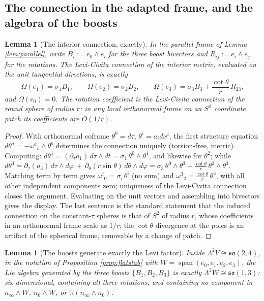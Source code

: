 \documentclass[11pt]{article}
\newtheorem{lemma}[theorem]{Lemma}
\theoremstyle{definition}
\newcommand{\R}{\mathbb{R}}
\newcommand{\nO}{n_0}
\newcommand{\nInf}{n_\infty}
\begin{document}
\subsection{The connection in the adapted frame, and the algebra of the boosts}\label{subsec:connframe}

\begin{lemma}[The interior connection, exactly]\label{lem:conn}
In the parallel frame of Lemma \ref{lem:parallel}, write $B_i := e_0 \wedge e_i$ for the three boost bivectors and $R_{ij} := e_i \wedge e_j$ for the rotations. The Levi-Civita connection of the interior metric, evaluated on the unit tangential directions, is exactly
\[
\Omega(e_1) = \sigma_1 B_1, \qquad
\Omega(e_2) = \sigma_2 B_2, \qquad
\Omega(e_3) = \sigma_3 B_3 + \frac{\cot\theta}{r}\,R_{23},
\]
and $\Omega(e_0) = 0$. The rotation coefficient is the Levi-Civita connection of the round sphere of radius $r$: in any local orthonormal frame on an $S^2$ coordinate patch its coefficients are $O(1/r)$.
\end{lemma}

\begin{proof}
With orthonormal coframe $\theta^0 = d\tau$, $\theta^i = a_i dx^i$, the first structure equation $d\theta^a = -\omega^a{}_b \wedge \theta^b$ determines the connection uniquely (torsion-free, metric). Computing: $d\theta^1 = (\partial_\tau a_1)\,d\tau \wedge dt = \sigma_1\,\theta^0 \wedge \theta^1$, and likewise for $\theta^2$; while $d\theta^3 = \partial_\tau(a_3)\,d\tau\wedge d\varphi\,+\,\partial_\theta(r\sin\theta)\,d\theta \wedge d\varphi = \sigma_3\,\theta^0\wedge\theta^3 + \frac{\cot\theta}{r}\,\theta^2 \wedge \theta^3$. Matching term by term gives $\omega^i{}_0 = \sigma_i\,\theta^i$ (no sum) and $\omega^3{}_2 = \frac{\cot\theta}{r}\,\theta^3$, with all other independent components zero; uniqueness of the Levi-Civita connection closes the argument. Evaluating on the unit vectors and assembling into bivectors gives the display. The last sentence is the standard statement that the induced connection on the constant-$\tau$ spheres is that of $S^2$ of radius $r$, whose coefficients in an orthonormal frame scale as $1/r$; the $\cot\theta$ divergence at the poles is an artifact of the spherical frame, removable by a change of patch.
\end{proof}

\begin{lemma}[The boosts generate exactly the Levi factor]\label{lem:gen}
Inside $\Lambda^2 V \cong \mathfrak{so}(2,4)$, in the notation of Proposition \ref{prop:flatstab} with $W = \operatorname{span}(e_0, e_1, e_2, e_3)$, the Lie algebra generated by the three boosts $\{B_1, B_2, B_3\}$ is exactly $\Lambda^2 W \cong \mathfrak{so}(1,3)$: six-dimensional, containing all three rotations, and containing no component in $\nInf \wedge W$, $\nO \wedge W$, or $\R(\nInf\wedge\nO)$.
\end{lemma}
\end{document}

